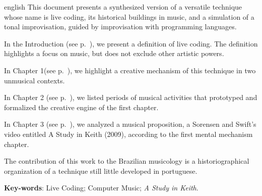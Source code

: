 \begin{resumo}[Abstract]
 \begin{otherlanguage*}{english}
	This document presents a synthesized version of a versatile technique whose name is live coding, its historical buildings in music, and a   simulation of a tonal improvisation, guided by improvisation with programming languages.
	
In the Introduction (see p.~\pageref{cap:intro}), we present a definition of live coding. The definition highlights
a focus on music, but does not exclude other artistic powers.

In Chapter 1(see p.~\pageref{cap:introducao}), we highlight a creative mechanism of this technique in two unmusical contexts.

In Chapter 2 (see p.~\pageref{cap:protohistoria}), we listed periods of musical activities that prototyped and formalized the creative engine of the first chapter.

In Chapter 3 (see p.~\pageref{cap:estudos_de_caso}), we analyzed a musical proposition, a Sorensen and Swift's video entitled A Study in Keith (2009), according to the first mental mechanism chapter.

The contribution of this work to the Brazilian musicology is a historiographical organization of a technique still little developed in portuguese.
   \vspace{\onelineskip}
 
   \noindent 
   \textbf{Key-words}: Live Coding; Computer Music; \emph{A Study in Keith}.
 \end{otherlanguage*}
\end{resumo}

\begin{comment}

\begin{resumo}[Résumé]
 \begi'n{otherlanguage*}{french}
    Il s'agit d'un résumé en français.
 
   \textbf{Mots-clés}: latex. abntex. publication de textes.
 \end{otherlanguage*}
\end{resumo}

\begin{resumo}[Resumen]
 \begin{otherlanguage*}{spanish}
   Este es el resumen en español.
  
   \textbf{Palabras clave}: latex. abntex. publicación de textos.
 \end{otherlanguage*}
\end{resumo}
\end{comment}
